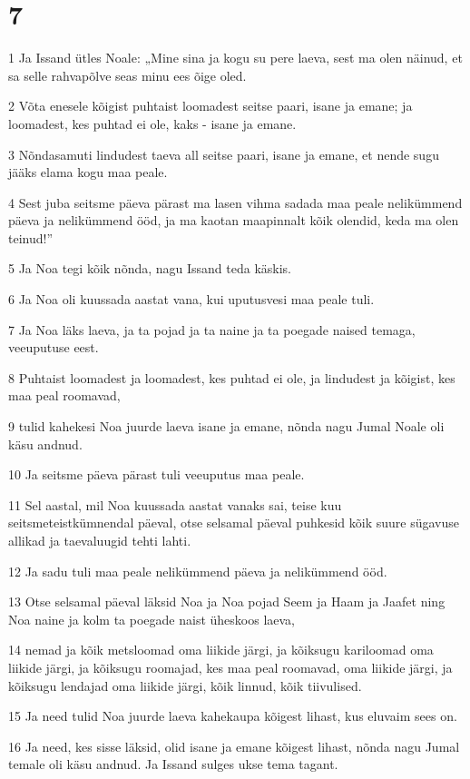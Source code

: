 \chapter{7}

\par 1 Ja Issand ütles Noale: „Mine sina ja kogu su pere laeva, sest ma olen näinud, et sa selle rahvapõlve seas minu ees õige oled.
\par 2 Võta enesele kõigist puhtaist loomadest seitse paari, isane ja emane; ja loomadest, kes puhtad ei ole, kaks - isane ja emane.
\par 3 Nõndasamuti lindudest taeva all seitse paari, isane ja emane, et nende sugu jääks elama kogu maa peale.
\par 4 Sest juba seitsme päeva pärast ma lasen vihma sadada maa peale nelikümmend päeva ja nelikümmend ööd, ja ma kaotan maapinnalt kõik olendid, keda ma olen teinud!”
\par 5 Ja Noa tegi kõik nõnda, nagu Issand teda käskis.
\par 6 Ja Noa oli kuussada aastat vana, kui uputusvesi maa peale tuli.
\par 7 Ja Noa läks laeva, ja ta pojad ja ta naine ja ta poegade naised temaga, veeuputuse eest.
\par 8 Puhtaist loomadest ja loomadest, kes puhtad ei ole, ja lindudest ja kõigist, kes maa peal roomavad,
\par 9 tulid kahekesi Noa juurde laeva isane ja emane, nõnda nagu Jumal Noale oli käsu andnud.
\par 10 Ja seitsme päeva pärast tuli veeuputus maa peale.
\par 11 Sel aastal, mil Noa kuussada aastat vanaks sai, teise kuu seitsmeteistkümnendal päeval, otse selsamal päeval puhkesid kõik suure sügavuse allikad ja taevaluugid tehti lahti.
\par 12 Ja sadu tuli maa peale nelikümmend päeva ja nelikümmend ööd.
\par 13 Otse selsamal päeval läksid Noa ja Noa pojad Seem ja Haam ja Jaafet ning Noa naine ja kolm ta poegade naist üheskoos laeva,
\par 14 nemad ja kõik metsloomad oma liikide järgi, ja kõiksugu kariloomad oma liikide järgi, ja kõiksugu roomajad, kes maa peal roomavad, oma liikide järgi, ja kõiksugu lendajad oma liikide järgi, kõik linnud, kõik tiivulised.
\par 15 Ja need tulid Noa juurde laeva kahekaupa kõigest lihast, kus eluvaim sees on.
\par 16 Ja need, kes sisse läksid, olid isane ja emane kõigest lihast, nõnda nagu Jumal temale oli käsu andnud. Ja Issand sulges ukse tema tagant.
